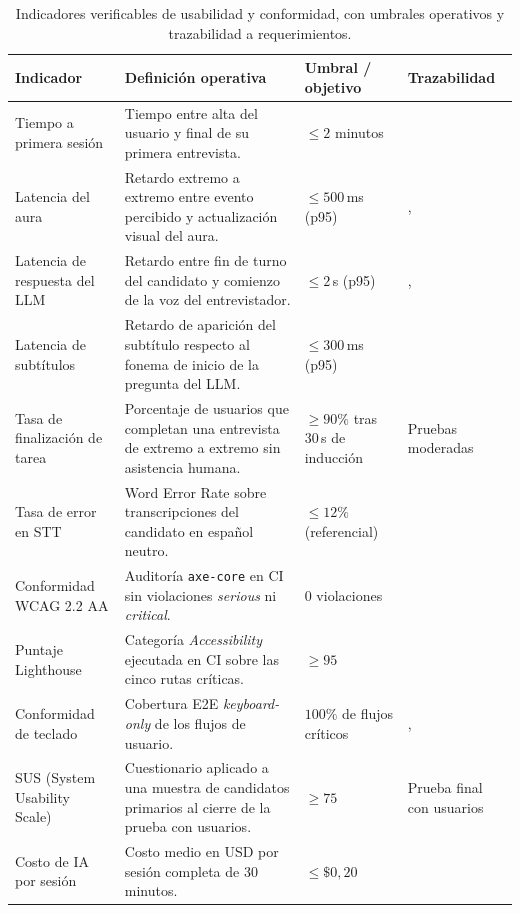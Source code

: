 \begin{table}[ht]
\centering
\renewcommand{\arraystretch}{1.25}
\footnotesize
\begin{tabularx}{\linewidth}{@{}p{3.6cm} Y p{3.0cm} p{2.4cm}@{}}
\toprule
\textbf{Indicador} & \textbf{Definición operativa} &
\textbf{Umbral / objetivo} & \textbf{Trazabilidad} \\
\midrule
Tiempo a primera sesión & Tiempo entre alta del usuario y final de su
primera entrevista. & $\le 2$ minutos &  \\
\addlinespace
Latencia del aura & Retardo extremo a extremo entre evento percibido y
actualización visual del aura. & $\le 500$\,ms (p95) & ,
 \\
\addlinespace
Latencia de respuesta del LLM & Retardo entre fin de turno del
candidato y comienzo de la voz del entrevistador. & $\le 2$\,s (p95)
& ,  \\
\addlinespace
Latencia de subtítulos & Retardo de aparición del subtítulo respecto
al fonema de inicio de la pregunta del LLM. & $\le 300$\,ms (p95) &
 \\
\addlinespace
Tasa de finalización de tarea & Porcentaje de usuarios que completan
una entrevista de extremo a extremo sin asistencia humana. &
$\ge 90\%$ tras 30\,s de inducción & Pruebas moderadas \\
\addlinespace
Tasa de error en STT &
Word Error Rate sobre transcripciones del candidato en español neutro.
& $\le 12\%$ (referencial) &  \\
\addlinespace
Conformidad WCAG 2.2 AA &
Auditoría \texttt{axe-core} en CI sin violaciones \textit{serious} ni
\textit{critical}. & 0 violaciones &  \\
\addlinespace
Puntaje Lighthouse &
Categoría \textit{Accessibility} ejecutada en CI sobre las cinco rutas
críticas. & $\ge 95$ &  \\
\addlinespace
Conformidad de teclado &
Cobertura E2E \textit{keyboard-only} de los flujos de usuario. &
$100\%$ de flujos críticos & ,  \\
\addlinespace
SUS (System Usability Scale) &
Cuestionario aplicado a una muestra de candidatos primarios al cierre
de la prueba con usuarios. & $\ge 75$ & Prueba final con
usuarios \\
\addlinespace
Costo de IA por sesión &
Costo medio en USD por sesión completa de 30 minutos. &
$\le \$0{,}20$ &  \\
\bottomrule
\end{tabularx}
\caption{Indicadores verificables de usabilidad y conformidad,
con umbrales operativos y trazabilidad a requerimientos.}
\label{tab:indicadores}
\end{table}

